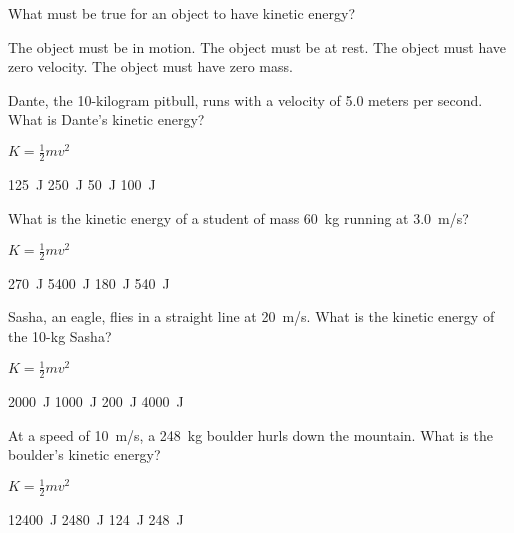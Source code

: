 \documentclass[]{exam}
\begin{document}
\begin{questions}
    
\question
What must be true for an object to have kinetic energy?

\begin{randomizechoices}
    \correctchoice The object must be in motion.
    \choice The object must be at rest.
    \choice The object must have zero velocity.
    \choice The object must have zero mass.
\end{randomizechoices}


\question \label{taHSMX}
Dante, the 10-kilogram pitbull, runs with a velocity of 5.0 meters per second. What is Dante's kinetic energy?

\ifprintanswers
{\color{red}
$K = \frac{1}{2} m v^2$
}
\fi

\begin{randomizechoices}
    \correctchoice \SI{125}{J}
    \choice \SI{250}{J}
    \choice \SI{50}{J}
    \choice \SI{100}{J}
\end{randomizechoices}


\question \label{QRI2H9}
What is the kinetic energy of a student of mass \SI{60}{kg} running at \SI{3.0}{m/s}?

\ifprintanswers
{\color{red}
$K = \frac{1}{2} m v^2$
}
\fi


\begin{randomizechoices}
    \correctchoice \SI{270}{J}
    \choice \SI{5400}{J}
    \choice \SI{180}{J}
    \choice \SI{540}{J}
\end{randomizechoices}


\question \label{ixc46e}
Sasha, an eagle, flies in a straight line at \SI{20}{m/s}. What is the kinetic energy of the 10-kg Sasha? 

\ifprintanswers
{\color{red}
$K = \frac{1}{2} m v^2$
}
\fi


\begin{randomizechoices}
    \correctchoice \SI{2000}{J}
    \choice \SI{1000}{J}
    \choice \SI{200}{J}
    \choice \SI{4000}{J}
\end{randomizechoices}


\question \label{dguWEr}
At a speed of \SI{10}{m/s}, a \SI{248}{kg} boulder hurls down the mountain. What is the boulder's kinetic energy?

\ifprintanswers
{\color{red}
$K = \frac{1}{2} m v^2$
}
\fi


\begin{randomizechoices}
    \correctchoice \SI{12400}{J}
    \choice \SI{2480}{J}
    \choice \SI{124}{J}
    \choice \SI{248}{J}
\end{randomizechoices}



\end{questions}
\end{document}
